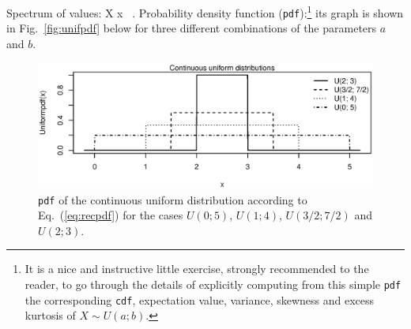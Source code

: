 \medskip
\noindent
Spectrum of values:
%
\be
X \mapsto x \in \left[a,b\right]
\subset {} \ .
\ee
%
Probability density function (\texttt{pdf}):\footnote{It is a nice 
and instructive little exercise, strongly recommended to the 
reader, to go through the details of explicitly computing from 
this simple \texttt{pdf} the corresponding \texttt{cdf}, expectation 
value, variance, skewness and excess kurtosis of $X \sim U(a;b)$.}
%
\be
{}
\ee
%
its graph is shown in Fig.~\ref{fig:unifpdf} below for three 
different combinations of the parameters $a$ and $b$.
%
\begin{figure}[!htb]
\begin{center}
\includegraphics[scale=0.8]{unifpdf.eps}
\end{center}
\caption{\texttt{pdf} of the continuous uniform distribution 
according to Eq.~(\ref{eq:recpdf}) for the cases $U(0;5)$, 
$U(1;4)$, $U(3/2;7/2)$ and $U(2;3)$.}
\end{figure}
%

